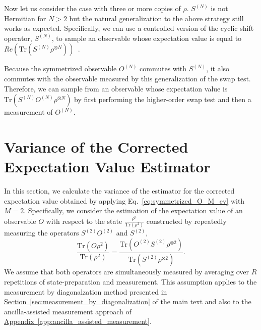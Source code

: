 \documentclass[
amsmath,
amssymb,
aps,
pra,
reprint,
twocolumn,
superscriptaddress,
longbibliography,
showkeys,
floatfix
]{revtex4-1}
\def\tr{\mathrm{Tr}}
\newcommand{\eq}[1]{Eq.~\hyperref[eq:#1]{\ref*{eq:#1}}}
\renewcommand{\sec}[1]{\hyperref[sec:#1]{Section~\ref*{sec:#1}}}
\newcommand{\app}[1]{\hyperref[app:#1]{Appendix~\ref*{app:#1}}}
\begin{document}
Now let us consider the case with three or more copies of \(\rho\). 
\(S^{(N)}\) is not Hermitian for \(N > 2\) but the natural generalization to the
above strategy still works as expected. 
Specifically, we can use a controlled version of the cyclic shift operator,
\(S^{(N)}\), to sample an observable whose expectation value is equal to
\(Re(\tr(S^{(N)} \rho^{\otimes N}))\)~\cite{Ekert2002-gl, Brun2004-do, Cotler2019-rh}. 

Because the symmetrized observable \(O^{(N)}\) commutes with \(S^{(N)}\), it
also commutes with the observable measured by this generalization of the swap
test. 
Therefore, we can sample from an observable whose expectation value is
\(\tr(S^{(N)} O^{(N)} \rho ^{\otimes N})\) by first performing the higher-order
swap test and then a measurement of \(O^{(N)}\).

\section{Variance of the Corrected Expectation Value Estimator}
\label{app:estimator_variance}

In this section, we calculate the variance of the estimator for the
corrected expectation value obtained by applying \eq{symmetrized_O_M_ev} with
\(M=2\). 
Specifically, we consider the estimation of the expectation value of an
observable \(O\) with respect to the state \(\frac{\rho^2}{\tr(\rho^2)}\)
constructed by repeatedly measuring the operators \(S^{(2)}O^{(2)}\) and
\(S^{(2)}\),
\begin{equation}
  \frac{\tr(O \rho^2)}{\tr(\rho^2)} = \frac{\tr(O^{(2)} S^{(2)} \rho^{\otimes 2})}{\tr(S^{(2)} \rho^{\otimes 2})}.
  \label{eq:symmetrized_O_2_ev}
\end{equation}
We assume that both operators are simultaneously measured by averaging over
\(R\) repetitions of state-preparation and measurement.
This assumption applies to the measurement by diagonalzation method presented in
\sec{measurement_by_diagonalization} of the main text and also to the
ancilla-assisted measurement approach of \app{ancilla_assisted_measurement}.
\end{document}
